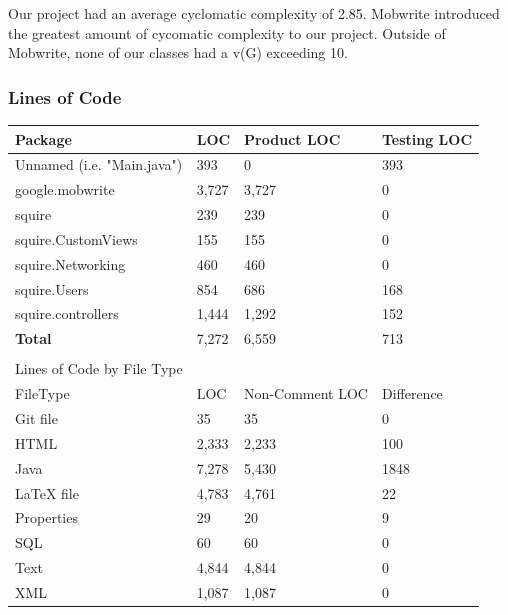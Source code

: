 \documentclass[twoside,letterpaper]{article}
\begin{document}
\noindent	Our project had an average cyclomatic complexity of 2.85. Mobwrite introduced the greatest amount of cycomatic complexity to our project. Outside of Mobwrite, none of our classes had a v(G) exceeding 10.
	
	
\subsubsection{Lines of Code}

\begin{tabular}{|l|l|l|l|}
\hline
Package                    & LOC   & Product LOC     & Testing LOC \\ \hline
Unnamed (i.e. "Main.java") & 393   & 0               & 393         \\ \hline
google.mobwrite            & 3,727 & 3,727           & 0           \\ \hline
squire                     & 239   & 239             & 0           \\ \hline
squire.CustomViews         & 155   & 155             & 0           \\ \hline
squire.Networking          & 460   & 460             & 0           \\ \hline
squire.Users               & 854   & 686             & 168         \\ \hline
squire.controllers         & 1,444 & 1,292           & 152         \\ \hline
\textbf{Total}			   &	7,272 & 6,559		    & 713		\\ \hline
                           &       &                 &             \\ \hline
Lines of Code by File Type &       &                 &             \\ \hline
FileType                   & LOC   & Non-Comment LOC & Difference  \\ \hline
Git file                   & 35    & 35              & 0           \\ \hline
HTML                       & 2,333 & 2,233           & 100         \\ \hline
Java                       & 7,278 & 5,430           & 1848        \\ \hline
LaTeX file                 & 4,783 & 4,761           & 22          \\ \hline
Properties                 & 29    & 20              & 9           \\ \hline
SQL                        & 60    & 60              & 0           \\ \hline
Text                       & 4,844 & 4,844           & 0           \\ \hline
XML                        & 1,087 & 1,087           & 0           \\ \hline
\end{tabular}
\end{document}
